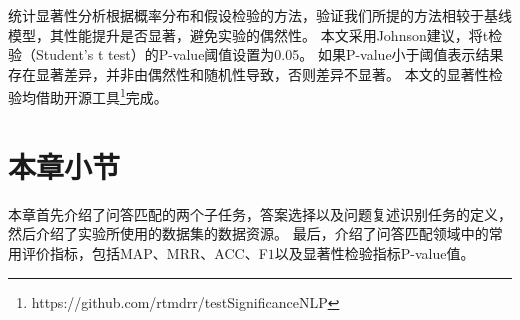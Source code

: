 统计显著性分析根据概率分布和假设检验的方法，验证我们所提的方法相较于基线模型，其性能提升是否显著，避免实验的偶然性。
本文采用Johnson\cite{johnson1999insignificance}建议，将t检验（Student's t test）的P-value阈值设置为0.05。
如果P-value小于阈值表示结果存在显著差异，并非由偶然性和随机性导致，否则差异不显著。
本文的显著性检验均借助开源工具\footnote{https://github.com/rtmdrr/testSignificanceNLP}完成。

\section{本章小节}

本章首先介绍了问答匹配的两个子任务，答案选择以及问题复述识别任务的定义，然后介绍了实验所使用的数据集的数据资源。
最后，介绍了问答匹配领域中的常用评价指标，包括MAP、MRR、ACC、F$1$以及显著性检验指标P-value值。